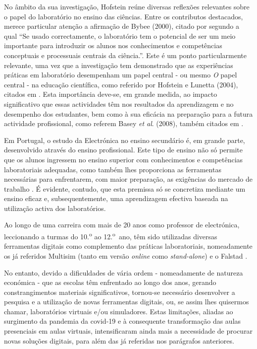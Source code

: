 No âmbito da sua investigação, Hofstein reúne diversas reflexões relevantes sobre o papel do laboratório no ensino das ciências.    
Entre os contributos destacados, merece particular atenção a afirmação de Bybee  (2000), citado por \cite{Hofstein} segundo a qual ``Se usado correctamente, o laboratório tem o potencial de ser um meio importante para introduzir os alunos nos conhecimentos e competências conceptuais e processuais centrais da ciência.''. Este é um ponto particularmente relevante, uma vez que a investigação tem demonstrado que as experiências práticas em laboratório desempenham um papel central - ou mesmo \textit{O} papel central - na educação científica, como referido por Hofstein e Lunetta (2004), citados em \cite{BRINSON2015218}. Esta importância deve-se, em grande medida, ao impacto significativo que essas actividades têm nos resultados da aprendizagem e no desempenho dos estudantes, bem como à sua eficácia na preparação para a futura actividade profissional, como referem Basey \textit{et al}. (2008), também citados em \cite{BRINSON2015218}.

Em Portugal, o estudo da Electrónica no ensino secundário é, em grande parte, desenvolvido através do ensino profissional. Este tipo de ensino não só permite que os alunos ingressem no ensino superior com conhecimentos e competências laboratoriais adequadas, como também lhes proporciona as ferramentas necessárias para enfrentarem, com maior preparação, as exigências do mercado de trabalho \cite{anqep}. É evidente, contudo, que esta premissa só se concretiza mediante um ensino eficaz e, subsequentemente, uma aprendizagem efectiva baseada na utilização activa dos laboratórios.

Ao longo de uma carreira com mais de 20 anos como professor de electrónica, leccionando a turmas do 10.\textsuperscript{o} ao 12.\textsuperscript{o}~ano, têm sido utilizadas diversas ferramentas digitais como complemento das práticas laboratoriais, nomeadamente os já referidos Multisim \cite{multisim} (tanto em versão \textit{online} como \textit{stand-alone}) e o Falstad \cite{falstad}.

No entanto, devido a dificuldades de vária ordem - nomeadamente de natureza económica - que as escolas têm enfrentado ao longo dos anos, gerando constrangimentos materiais significativos, tornou-se necessário desenvolver a pesquisa e a utilização de novas ferramentas digitais, ou, se assim lhes quisermos chamar, laboratórios virtuais e/ou simuladores. Estas limitações, aliadas ao surgimento da pandemia da \acrshort{covid-19} e à consequente transformação das aulas presenciais em aulas virtuais, intensificaram ainda mais a necessidade de procurar novas soluções digitais, para além das já referidas nos parágrafos anteriores.

